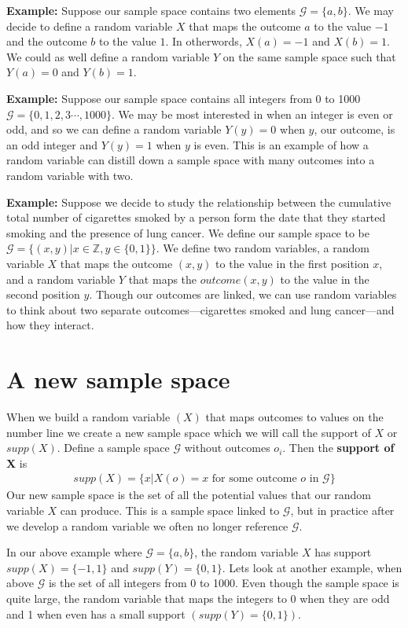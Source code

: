 \textbf{Example:} Suppose our sample space contains two elements $\mathcal{G} = \{ a,b \}$. We may decide to define a random variable $X$ that maps the outcome $a$ to the value $-1$ and the outcome $b$ to the value $1$. In otherwords, $X(a)=-1$ and $X(b)=1$. We could as well define a random variable $Y$ on the same sample space such that $Y(a)=0$ and $Y(b)=1$.

\textbf{Example:} Suppose our sample space contains all integers from 0 to 1000 $\mathcal{G} = \{0,1,2,3\cdots,1000 \}$. We may be most interested in when an integer is even or odd, and so we can define a random variable $Y(y)=0$ when $y$, our outcome, is an odd integer and $Y(y)=1$ when $y$ is even. This is an example of how a random variable can distill down a sample space with many outcomes into a random variable with two.

\textbf{Example:} Suppose we decide to study the relationship between the cumulative total number of cigarettes smoked by a person form the date that they started smoking and the presence of lung cancer.
We define our sample space to be $\mathcal{G} = \{ (x,y) | x \in \mathbb{Z}, y \in \{0,1\} \}$. We define two random variables, a random variable $X$ that maps the outcome $(x,y)$ to the value in the first position $x$, and a random variable $Y$ that maps the $outcome (x,y)$ to the value in the second position $y$. Though our outcomes are linked, we can use random variables to think about two separate outcomes---cigarettes smoked and lung cancer---and how they interact.

\section{A new sample space}\label{intro}

When we build a random variable $(X)$ that maps outcomes to values on the number line we create a new sample space which we will call the support of $X$ or $supp(X)$. 
Define a sample space $\mathcal{G}$ without outcomes $o_{i}$.
Then the \textbf{support of X} is
\begin{align}
    supp(X) = \{x | X(o) = x \text{ for some outcome } o \text{ in } \mathcal{G} \}
\end{align}
Our new sample space is the set of all the potential values that our random variable $X$ can produce.
This is a sample space linked to $\mathcal{G}$, but in practice after we develop a random variable we often no longer reference $\mathcal{G}$.

\ex In our above example where $\mathcal{G} = \{a,b\}$, the random variable $X$ has support $supp(X) = \{-1,1\}$ and $supp(Y)=\{0,1\}$.
Lets look at another example, when above $\mathcal{G}$ is  the set of all integers from 0 to 1000. 
Even though the sample space is quite large, the random variable that maps the integers to 0 when they are odd and 1 when even has a small support $(supp(Y) = \{0,1\})$.   

